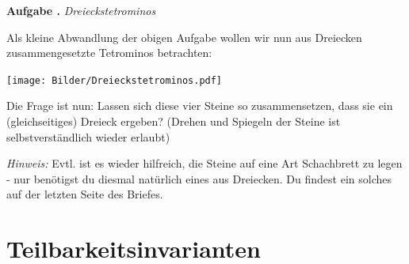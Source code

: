 \documentclass[a4paper,ngerman,12pt]{scrartcl}
\theoremstyle{definition}
\theoremstyle{plain}
\theoremstyle{remark}
\newlength{\aufgabenskip}
\newcounter{aufgabennummer}
\newenvironment{aufgabe}[1]{
	\addtocounter{aufgabennummer}{1}
	\textbf{Aufgabe \theaufgabennummer.} \emph{#1} \par
}{\vspace{\aufgabenskip}}
\begin{document}
\begin{aufgabe}{Dreieckstetrominos}
	Als kleine Abwandlung der obigen Aufgabe wollen wir nun aus Dreiecken zusammengesetzte \glqq Tetrominos\grqq{} betrachten:
	\begin{center}
		\texttt{[image: Bilder/Dreieckstetrominos.pdf]}
	\end{center}
	Die Frage ist nun: Lassen sich diese vier Steine so zusammensetzen, dass sie ein (gleichseitiges) Dreieck ergeben? (Drehen und Spiegeln der Steine ist selbstverständlich wieder erlaubt)
	
	\emph{Hinweis:} Evtl. ist es wieder hilfreich, die Steine auf eine Art \glqq Schachbrett\grqq{} zu legen - nur benötigst du diesmal natürlich eines aus Dreiecken. Du findest ein solches auf der letzten Seite des Briefes.
\end{aufgabe}


\section{Teilbarkeitsinvarianten}
\end{document}
